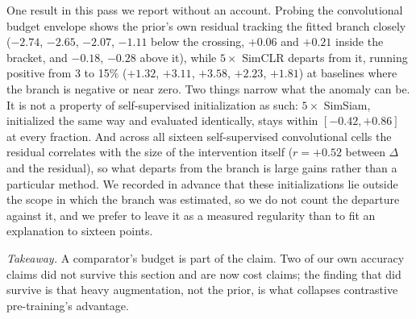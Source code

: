  One result in this pass we report without an account. Probing the convolutional
budget envelope shows the prior's own residual tracking the fitted branch
closely ($-2.74$, $-2.65$, $-2.07$, $-1.11$ below the crossing, $+0.06$ and
$+0.21$ inside the bracket, and $-0.18$, $-0.28$ above it), while $5\times$ SimCLR departs from it,
running positive from 3 to 15\% ($+1.32$, $+3.11$, $+3.58$, $+2.23$, $+1.81$)
at baselines where the branch is negative or near zero. Two things narrow what
the anomaly can be. It is not a property of self-supervised initialization as
such: $5\times$ SimSiam, initialized the same way and evaluated identically,
stays within $[-0.42, +0.86]$ at every fraction. And across all sixteen
self-supervised convolutional cells the residual correlates with the size of
the intervention itself ($r = +0.52$ between $\Delta$ and the residual), so
what departs from the branch is large gains rather than a particular method. We
recorded in advance that these initializations lie outside the scope in which
the branch was estimated, so we do not count the departure against it, and we
prefer to leave it as a measured regularity than to fit an explanation to
sixteen points.

\emph{Takeaway.} A comparator's budget is part of the claim. Two of our own
accuracy claims did not survive this section and are now cost claims; the
finding that did survive is that heavy augmentation, not the prior, is what
collapses contrastive pre-training's advantage.
